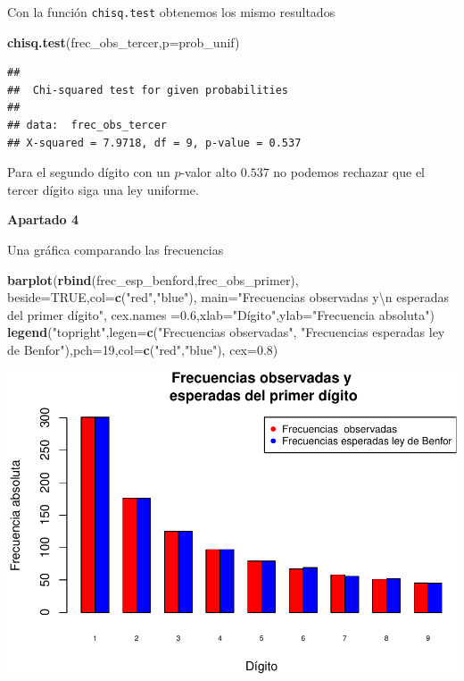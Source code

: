 \documentclass[
]{article}
\newenvironment{Shaded}{\begin{snugshade}}{\end{snugshade}}
\newcommand{\CharTok}[1]{\textcolor[rgb]{0.31,0.60,0.02}{#1}}
\newcommand{\DataTypeTok}[1]{\textcolor[rgb]{0.13,0.29,0.53}{#1}}
\newcommand{\DecValTok}[1]{\textcolor[rgb]{0.00,0.00,0.81}{#1}}
\newcommand{\FloatTok}[1]{\textcolor[rgb]{0.00,0.00,0.81}{#1}}
\newcommand{\KeywordTok}[1]{\textcolor[rgb]{0.13,0.29,0.53}{\textbf{#1}}}
\newcommand{\NormalTok}[1]{#1}
\newcommand{\OtherTok}[1]{\textcolor[rgb]{0.56,0.35,0.01}{#1}}
\newcommand{\StringTok}[1]{\textcolor[rgb]{0.31,0.60,0.02}{#1}}
\begin{document}
Con la función \texttt{chisq.test} obtenemos los mismo resultados

\begin{Shaded}
\begin{Highlighting}[]
\KeywordTok{chisq.test}\NormalTok{(frec\_obs\_tercer,}\DataTypeTok{p=}\NormalTok{prob\_unif)}
\end{Highlighting}
\end{Shaded}

\begin{verbatim}
## 
##  Chi-squared test for given probabilities
## 
## data:  frec_obs_tercer
## X-squared = 7.9718, df = 9, p-value = 0.537
\end{verbatim}

Para el segundo dígito con un \(p\)-valor alto \(0.537\) no podemos
rechazar que el tercer dígito siga una ley uniforme.

\textbf{Apartado 4}

Una gráfica comparando las frecuencias

\begin{Shaded}
\begin{Highlighting}[]
\KeywordTok{barplot}\NormalTok{(}\KeywordTok{rbind}\NormalTok{(frec\_esp\_benford,frec\_obs\_primer),}
        \DataTypeTok{beside=}\OtherTok{TRUE}\NormalTok{,}\DataTypeTok{col=}\KeywordTok{c}\NormalTok{(}\StringTok{"red"}\NormalTok{,}\StringTok{"blue"}\NormalTok{),}
        \DataTypeTok{main=}\StringTok{"Frecuencias observadas y}\CharTok{\textbackslash{}n}\StringTok{ esperadas del primer dígito"}\NormalTok{,}
        \DataTypeTok{cex.names =}\FloatTok{0.6}\NormalTok{,}\DataTypeTok{xlab=}\StringTok{"Dígito"}\NormalTok{,}\DataTypeTok{ylab=}\StringTok{"Frecuencia absoluta"}\NormalTok{)}
\KeywordTok{legend}\NormalTok{(}\StringTok{"topright"}\NormalTok{,}\DataTypeTok{legen=}\KeywordTok{c}\NormalTok{(}\StringTok{"Frecuencias  observadas"}\NormalTok{,}
                          \StringTok{"Frecuencias esperadas ley de Benfor"}\NormalTok{),}\DataTypeTok{pch=}\DecValTok{19}\NormalTok{,}\DataTypeTok{col=}\KeywordTok{c}\NormalTok{(}\StringTok{"red"}\NormalTok{,}\StringTok{"blue"}\NormalTok{),}
       \DataTypeTok{cex=}\FloatTok{0.8}\NormalTok{)}
\end{Highlighting}
\end{Shaded}

\includegraphics{taller_problemas_resueltos_extra_1_files/figure-latex/unnamed-chunk-15-1.pdf}
\end{document}
